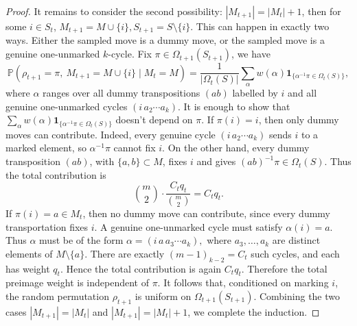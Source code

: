 \begin{proof}
It remains to consider the second possibility: $|M_{t+1}| = |M_t|+1$, then for some $i \in S_t$, $M_{t+1}=M\cup\{i\}, S_{t+1}=S\setminus\{i\}.$ This can happen in exactly two ways. Either the sampled move is a dummy move, or the sampled move is a genuine one-unmarked \(k\)-cycle. Fix $\pi\in\Omega_{t+1}(S_{t+1})$, we have 
\[
\mathbb P(\rho_{t+1}=\pi,\ M_{t+1}=M\cup\{i\}\mid M_t=M)
=
\frac{1}{|\Omega_t(S)|}
\sum_{\alpha}
w(\alpha)\mathbf 1_{\{\alpha^{-1}\pi\in\Omega_t(S)\}},
\] where \(\alpha\) ranges over all dummy transpositions \((ab)\) labelled by \(i\) and all genuine
one-unmarked cycles \((i\,a_2\cdots a_k)\). It is enough to show that $\sum_{\alpha}
w(\alpha)\mathbf 1_{\{\alpha^{-1}\pi\in\Omega_t(S)\}}$ doesn't depend on $\pi$. If $\pi(i) = i$, then only dummy moves can contribute. Indeed, every genuine cycle
\((i\,a_2\cdots a_k)\) sends \(i\) to a marked element, so \(\alpha^{-1}\pi\) cannot fix \(i\).
On the other hand, every dummy transposition \((ab)\), with \(\{a,b\}\subset M\), fixes \(i\)
and gives
$
(ab)^{-1}\pi\in\Omega_t(S).
$
Thus the total contribution is
\[
\binom m2\cdot \frac{C_tq_t}{\binom m2}=C_tq_t.
\]
If \(\pi(i)=a\in M_t\), then no dummy move can contribute, since every dummy transportation fixes $i$. A genuine one-unmarked cycle must satisfy $ \alpha(i)=a.$
Thus \(\alpha\) must be of the form
$\alpha=(i\,a\,a_3\cdots a_k),$
where $a_3,\ldots,a_k$ are distinct elements of $M\setminus\{a\}$. There are exactly $(m-1)_{k-2}=C_t$
such cycles, and each has weight \(q_t\). Hence the total contribution is again $C_tq_t$. Therefore the total preimage weight is independent of $\pi$. It follows that, conditioned on marking \(i\), the random permutation \(\rho_{t+1}\) is uniform on $\Omega_{t+1}(S_{t+1})$. Combining the two cases \(|M_{t+1}|=|M_t|\) and \(|M_{t+1}|=|M_t|+1\), we complete the induction. 
\end{proof}
